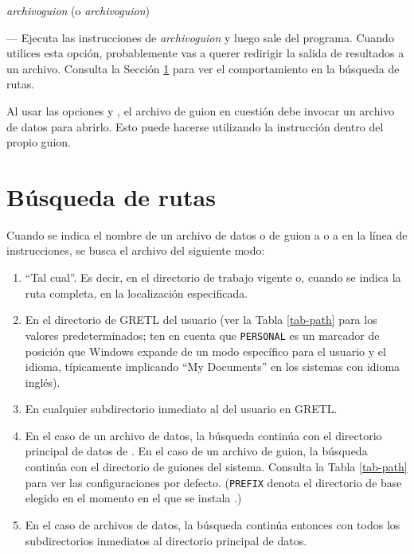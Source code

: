  \textsl{archivoguion} (o 
\textsl{archivoguion})

--- Ejecuta las instrucciones de \textsl{archivoguion} y luego sale del programa.
Cuando utilices esta opción, probablemente vas a querer redirigir la salida de
resultados a un archivo. Consulta la Sección \ref{path-search} para ver el
comportamiento en la búsqueda de rutas.

Al usar las opciones  y , el archivo de guion en cuestión
debe invocar un archivo de datos para abrirlo. Esto puede hacerse utilizando
la instrucción  dentro del propio guion.
      
\section{Búsqueda de rutas}
\label{path-search}

Cuando se indica el nombre de un archivo de datos o de guion a  o
a  en la línea de instrucciones, se busca el archivo del siguiente
modo:

\begin{enumerate}
\item ``Tal cual''.  Es decir, en el directorio de trabajo vigente o, cuando
  se indica la ruta completa, en la localización especificada.
\item En el directorio de GRETL del usuario (ver la Tabla \ref{tab-path} para los
  valores predeterminados; ten en cuenta que \texttt{PERSONAL} es un marcador
  de posición que Windows expande de un modo específico para el usuario y el
  idioma, típicamente implicando ``My Documents'' en los sistemas con idioma inglés).
\item En cualquier subdirectorio inmediato al del usuario en GRETL.
\item En el caso de un archivo de datos, la búsqueda continúa con el directorio principal
  de datos de . En el caso de un archivo de guion, la búsqueda continúa
  con el directorio de guiones del sistema. Consulta la Tabla \ref{tab-path} para ver
  las configuraciones por defecto. (\texttt{PREFIX} denota el directorio de base
  elegido en el momento en el que se instala .)
\item En el caso de archivos de datos, la búsqueda continúa entonces con todos los
  subdirectorios inmediatos al directorio principal de datos.
\end{enumerate}

